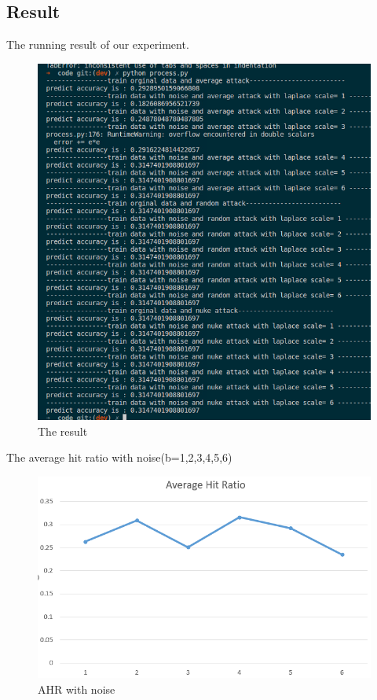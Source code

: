 \documentclass[a4paper, 12pt]{article}
\theoremstyle{definition}
\begin{document}
\subsection{Result}
The running result of our experiment.
\begin{figure}[H]
	\centering
	\includegraphics[scale = 0.4]{result.png}
	\caption{The result}
\end{figure}
The average hit ratio with noise(b=1,2,3,4,5,6)
\begin{figure}[H]
	\centering
	\includegraphics[scale = 0.4]{hit-ratio.png}
	\caption{AHR with noise}
\end{figure}
\end{document}
